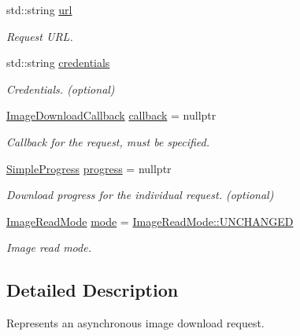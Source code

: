\begin{DoxyCompactItemize}
\item 
std\+::string \hyperlink{structdg_1_1deepcore_1_1imagery_1_1_image_download_request_a5080adfbdc1224d479c6f1818c832608}{url}
\begin{DoxyCompactList}\small\item\em Request U\+RL. \end{DoxyCompactList}\item 
std\+::string \hyperlink{structdg_1_1deepcore_1_1imagery_1_1_image_download_request_a70f18d1687b3b2582f1dd2c7db9ed289}{credentials}
\begin{DoxyCompactList}\small\item\em Credentials. (optional) \end{DoxyCompactList}\item 
\hyperlink{group___imagery_module_gab8f15d39d6d4bd5bcd727b5d8b28a721}{Image\+Download\+Callback} \hyperlink{structdg_1_1deepcore_1_1imagery_1_1_image_download_request_a8a891c06a52754a53a40226667e04bc8}{callback} = nullptr
\begin{DoxyCompactList}\small\item\em Callback for the request, must be specified. \end{DoxyCompactList}\item 
\hyperlink{group___utility_module_ga6763018df79e4bdbcd8cd14cea5342b2}{Simple\+Progress} \hyperlink{structdg_1_1deepcore_1_1imagery_1_1_image_download_request_a4f57be7a58f4c062ab20e0b44632bb2c}{progress} = nullptr
\begin{DoxyCompactList}\small\item\em Download progress for the individual request. (optional) \end{DoxyCompactList}\item 
\hyperlink{group___imagery_module_ga1db94ae833853b71ed501bb1ea8c1c24}{Image\+Read\+Mode} \hyperlink{structdg_1_1deepcore_1_1imagery_1_1_image_download_request_ada07837e04cd62ff704e540460173497}{mode} = \hyperlink{namespacedg_1_1deepcore_1_1imagery_ga1db94ae833853b71ed501bb1ea8c1c24a46335765005ff44b1fe1e38e5d2ddfcc}{Image\+Read\+Mode\+::\+U\+N\+C\+H\+A\+N\+G\+ED}
\begin{DoxyCompactList}\small\item\em Image read mode. \end{DoxyCompactList}\end{DoxyCompactItemize}


\subsection{Detailed Description}
Represents an asynchronous image download request. 

